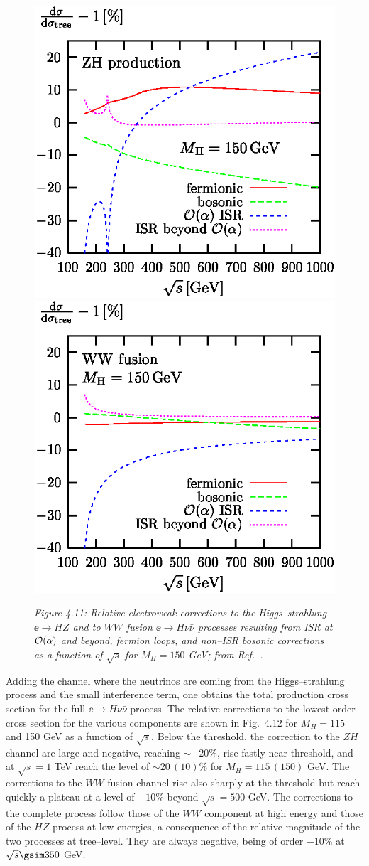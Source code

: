 {\begin{figure}%
\centerline{\includegraphics[width=.5\textwidth]{./sm4/contr.NC.eps}
\includegraphics[width=.5\textwidth]{./sm4/contr.CC.eps}}
\vspace*{3mm}
{\it Figure 4.11: Relative electroweak corrections to the Higgs--strahlung 
$\ee \to HZ$ and to $WW$ fusion $\ee \to H \nu\bar{\nu}$ processes resulting 
from ISR at ${\cal O}(\alpha)$  and beyond, fermion loops, and non--ISR 
bosonic corrections as a function of  $\sqrt{s}$ for $M_H = 150$ GeV; from 
Ref.~\cite{RCWW1}.}
\label{fi:contrchannels}
\vspace*{-3mm}
\end{figure}%
 
Adding the channel where the neutrinos are coming from the Higgs--strahlung
process and the small  interference term, one obtains the total production
cross section for the full $\ee \to H \nu \bar{\nu}$ process. The relative
corrections to the lowest  order cross section for the various components are
shown in Fig.~4.12 for $M_H=115$ and 150 GeV as a function of $\sqrt{s}$. Below
the threshold, the correction to the $ZH$ channel are large and negative,
reaching $\sim -20$\%, rise fastly near threshold, and at $\sqrt{s}=1$ TeV 
reach the level of $\sim 20\, (10)$\% for $M_H=115\, (150)$ GeV. The
corrections to the $WW$ fusion channel rise also sharply at the threshold but
reach quickly a plateau at a level of $-10$\% beyond $\sqrt{s}=500$ GeV. The
corrections to the complete process follow those of the $WW$ component at high
energy and those of the $HZ$ process at low energies, a consequence of the
relative magnitude of the two processes at tree--level. They are always
negative, being of order $-10$\% at $\sqrt{s} \gsim 350$ GeV.  

}
